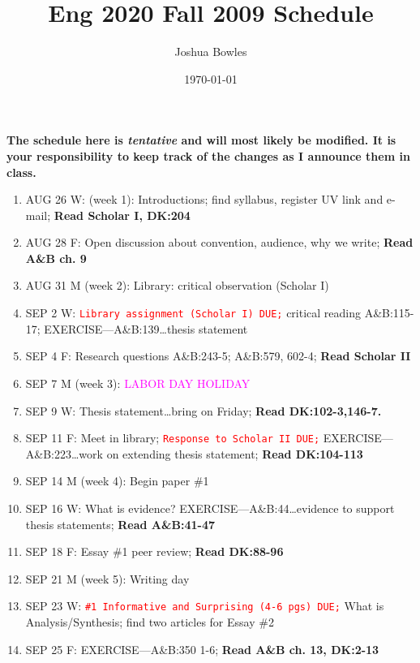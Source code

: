 \documentclass[11pt]{article}
\begin{document}
\author{Joshua Bowles}
\title{Eng 2020 Fall 2009 Schedule}
\date{\today}


\maketitle

   {\bf The schedule here is {\it tentative} and will most likely be modified. It is your responsibility to keep track of the changes as I announce them in class.}\\
   \begin{enumerate}
\item AUG 26 W: (week 1): Introductions; find syllabus, register UV link and e-mail; \textbf{Read Scholar I, DK:204}
\item[] AUG 28 F: Open discussion about convention, audience, why we write; \textbf{Read A\&B ch. 9}

\item  AUG 31 M (week 2): Library: critical observation (Scholar I) 
\item[] SEP 2 W: \textcolor{red}{\texttt{Library assignment (Scholar I) DUE;}} critical reading A\&B:115-17; EXERCISE---A\&B:139\ldots thesis statement  
\item[] SEP 4 F: Research questions A\&B:243-5; A\&B:579, 602-4; \textbf{Read Scholar II}

\item  SEP 7 M (week 3): \textcolor{magenta}{LABOR DAY HOLIDAY}
\item[] SEP 9 W: Thesis statement\ldots bring on Friday; \textbf{Read DK:102-3,146-7.}
\item[] SEP 11 F: Meet in library; \textcolor{red}{\texttt{Response to Scholar II DUE;}} EXERCISE---A\&B:223\ldots work on extending thesis statement; \textbf{Read DK:104-113}

\item  SEP 14 M (week 4): Begin paper \#1
\item[] SEP 16 W: What is evidence? EXERCISE---A\&B:44\ldots evidence to support thesis statements; \textbf{Read A\&B:41-47}
\item[] SEP 18 F: Essay \#1 peer review; \textbf{Read DK:88-96}

\item SEP 21 M (week 5): Writing day
\item[] SEP 23 W:  \textcolor{red}{\texttt{\#1 Informative and Surprising (4-6 pgs) DUE;}} What is Analysis/Synthesis; find two articles for Essay \#2 
\item[] SEP 25 F:  EXERCISE---A\&B:350 1-6; {\bf Read A\&B ch. 13, DK:2-13}


\end{enumerate}
\end{document}

